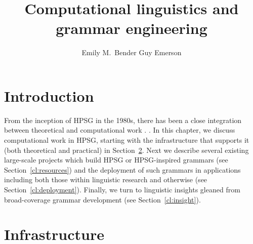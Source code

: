\documentclass[output=paper]{langsci/langscibook}
\author{%
	Emily M.\ Bender\affiliation{University of Washington}%
	\lastand Guy Emerson\affiliation{University of Cambridge}
}
\title{Computational linguistics and grammar engineering}
\begin{document}
\label{chap-cl}



\section{Introduction}


From the inception of HPSG in the 1980s,
there has been a close integration between theoretical and computational work
.
\citep{chapters/evolution}.
In this chapter, we discuss computational work in HPSG,
starting with the infrastructure that supports it (both theoretical and practical) in Section~\ref{cl:infrastructure}.
Next we describe several existing large-scale projects which build HPSG or HPSG-inspired grammars
(see Section~\ref{cl:resources})
and the deployment of such grammars in applications including both those within linguistic research and otherwise
(see Section~\ref{cl:deployment}).
Finally, we turn to linguistic insights gleaned from broad-coverage grammar development
(see Section~\ref{cl:insight}).



\section{Infrastructure}
\label{cl:infrastructure}
\end{document}
